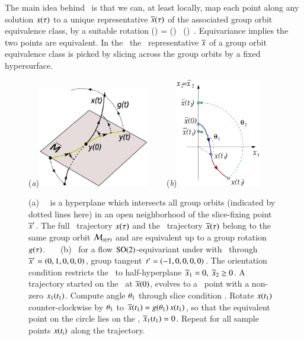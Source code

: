 \documentclass[preprint,number,sort&compress]{elsarticle}
\begin{document}
The main idea behind \mframes\ is that we can, at least locally,
map each point along any solution $x(\tau)$ to a unique
representative $\overline{x}(\tau)$ of the associated
group orbit equivalence class, by a suitable rotation
\beq
\ssp(\tau) = \LieEl(\tau) \, \sspRed(\tau)
\,.
Equivariance implies the two points are equivalent. In the
\mframes\ the \reducedsp\ representative $\overline{x}$ of a
group orbit equivalence class is picked by slicing across the
group orbits by a fixed hypersurface.
%
\begin{figure}[ht]
\begin{center}
(\textit{a})\includegraphics[width=0.43\textwidth,clip=true]{ReducTraj1}
~~~~(\textit{b})\includegraphics[width=0.33\textwidth,clip=true]{ESunrot}
\end{center}
\caption{
(a)
\Slice\ \pSRed\ is a hyperplane  which intersects
all
group orbits (indicated by dotted lines here) in an open
neighborhood of the slice-fixing point ${\overline{x}'}$. The full
\statesp\ trajectory $x(\tau)$ and the \reducedsp\
trajectory $\overline{x}(\tau)$ belong to the same group orbit
${\cal M}_{x(\tau)}$ and are equivalent up to a group rotation
$g(\tau)$.
~~~(b)
\Mframes\ for a flow $\textrm{SO}(2)$-equivariant under
 with \slice\ through ${\overline{x}'}=(0,1,0,0,0)$,
group tangent $t'_{}=(-1,0,0,0,0)$. The
orientation condition restricts the \slice\ to half-hyperplane
$\overline{x}_1=0,\;\overline{x}_2\ge 0$. A trajectory started on the
\slice\ at $\overline{x}(0)$, evolves to a \statesp\ point with a
non-zero $x_1(t_1)$. Compute angle ${\bf \theta}_1$
through slice condition . Rotate $x(t_1)$
counter-clockwise by ${\bf \theta}_1$ to $\overline{x}(t_1) =
g({\bf \theta}_1)\,x(t_1)$, so that the equivalent point
on the circle lies on the \slice, $\overline{x}_1(t_1) =0$. Repeat
for all sample points $x(t_i)$ along the trajectory.
}\label{fig:ReducTraj}
\end{figure}
%
\end{document}
